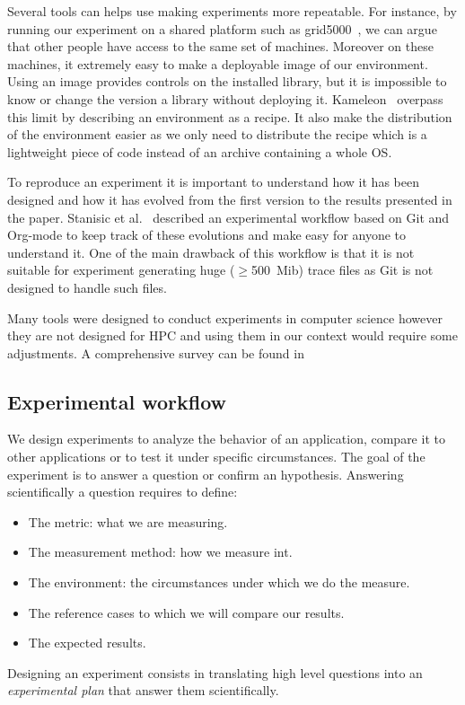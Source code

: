 Several tools can helps use making experiments more repeatable.
For instance, by running our experiment on a shared platform such as grid5000~\cite{Cappello05Grid5000}, we can argue that other people have access to the same set of machines.
Moreover on these machines, it extremely easy to make a deployable image of our environment.
Using an image provides controls on the installed library, but it is impossible to know or change the version a library without deploying it.
\gls{Kameleon}~\cite{Ruiz15Reconstructable} overpass this limit by describing an environment as a recipe.
It also make the distribution of the environment easier as we only need to distribute the recipe which is a lightweight piece of code instead of an archive containing a whole \gls{OS}.

To reproduce an experiment it is important to understand how it has been designed and how it has evolved from the first version to the results presented in the paper.
Stanisic et al.~\cite[Chapter~4, p31-44]{Stanisic15Reproducible} described an experimental workflow based on \gls{Git} and \gls{Org-mode} to keep track of these evolutions and make easy for anyone to understand it.
One of the main drawback of this workflow is that it is not suitable for experiment generating huge ($\ge$\SI{500}{Mib}) trace files as \gls{Git} is not designed to handle such files.

Many tools were designed to conduct experiments in computer science however they are not designed for \gls{HPC} and using them in our context would require some adjustments.
A comprehensive survey can be found in~\cite[Chapter~3, p17-19]{Stanisic15Reproducible}

\subsection{Experimental workflow}

We design experiments to analyze the behavior of an application, compare it to other applications or to test it under specific circumstances.
The goal of the experiment is to answer a question or confirm an hypothesis.
Answering scientifically a question requires to define:
\begin{itemize}
    \item The metric: what we are measuring.
    \item The measurement method: how we measure int.
    \item The environment: the circumstances under which we do the measure.
    \item The reference cases to which we will compare our results.
    \item The expected results.
\end{itemize}
Designing an experiment consists in translating high level questions into an \emph{experimental plan} that answer them scientifically.


